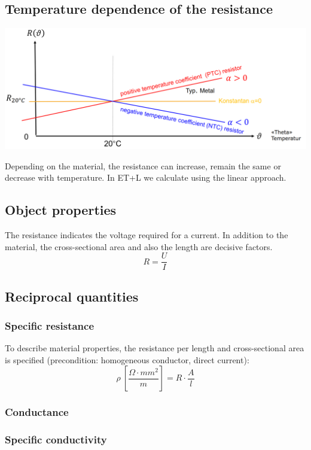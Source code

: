 \documentclass{article}
\begin{document}
\subsection{Temperature dependence of the resistance}
\begin{center}
    \includegraphics[width=\textwidth]{media/resistance.png}
\end{center}
Depending on the material, the resistance can increase, remain the same or decrease with temperature. In
ET+L we calculate using the linear approach.

\subsection{Object properties}
The resistance indicates the voltage required for a
current. In addition to the material, the cross-sectional
area and also the length are decisive factors.
\[R=\frac{U}{I}\]

\subsection{Reciprocal quantities}
\subsubsection{Specific resistance}
To describe material properties, the resistance per length
and cross-sectional area is specified (precondition:
homogeneous conductor, direct current):
\[\rho\ [\frac{\Omega \cdot mm^2}{m}] = R\cdot \frac{A}{l}\]

\subsubsection{Conductance}


\subsubsection{Specific conductivity}
\end{document}
